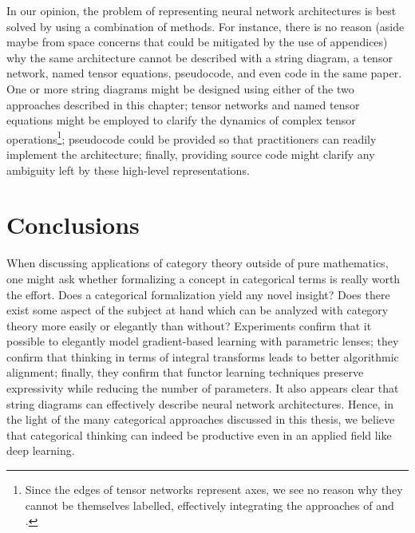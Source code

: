 \documentclass[11pt,a4paper,openright,twoside]{report}
\theoremstyle{plain}
\theoremstyle{definition}
\begin{document}
In our opinion, the problem of representing neural network architectures is best solved by using a combination of methods. For instance, there is no reason (aside maybe from space concerns that could be mitigated by the use of appendices) why the same architecture cannot be described with a string diagram, a tensor network, named tensor equations, pseudocode, and even code in the same paper. One or more string diagrams might be designed using either of the two approaches described in this chapter; tensor networks and named tensor equations might be employed to clarify the dynamics of complex tensor operations\footnote{Since the edges of tensor networks represent axes, we see no reason why they cannot be themselves labelled, effectively integrating the approaches of \cite{xu2023graph} and \cite{chiang2021named}.}; pseudocode could be provided so that practitioners can readily implement the architecture; finally, providing source code might clarify any ambiguity left by these high-level representations.

\clearpage{\pagestyle{empty}\cleardoublepage}


\chapter*{Conclusions}

When discussing applications of category theory outside of pure mathematics, one might ask whether formalizing a concept in categorical terms is really worth the effort. Does a categorical formalization yield any novel insight? Does there exist some aspect of the subject at hand which can be analyzed with category theory more easily or elegantly than without?  Experiments confirm that it possible to elegantly model gradient-based learning with parametric lenses; they confirm that thinking in terms of integral transforms leads to better algorithmic alignment; finally, they confirm that functor learning techniques preserve expressivity while reducing the number of parameters. It also appears clear that string diagrams can effectively describe neural network architectures. Hence, in the light of the many categorical approaches discussed in this thesis, we believe that categorical thinking can indeed be productive even in an applied field like deep learning.
\end{document}

